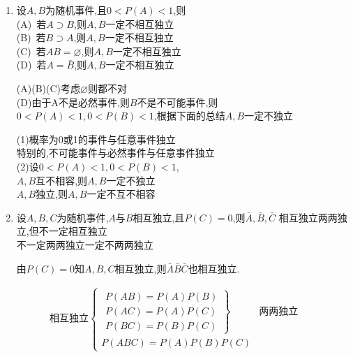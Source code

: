 \documentclass[12pt, a4paper, oneside, UTF8]{ctexbook}
\begin{document}
\begin{enumerate}[label=\arabic*.,start=12]
    \item  设$A,B$为随机事件,且$0<P(A)<1$,则 \\
        (A)\ 若$A\supset B$,则$A,B$一定不相互独立 \\
        (B)\ 若$B\supset A$,则$A,B$一定不相互独立 \\
        (C)\ 若$AB=\varnothing$,则$A,B$一定不相互独立 \\
        (D)\ 若$A=\bar{B}$,则$A,B$一定不相互独立
    
    \begin{solution}
    (A)(B)(C)考虑$\varnothing$则都不对\\
    (D)由于A不是必然事件,则$B$不是不可能事件,则$0<P(A)<1,0<P(B)<1$,根据下面的总结$A,B$一定不独立
    \end{solution}
    \begin{tcolorbox}[title=总结]
        (1)概率为0或1的事件与任意事件独立 \\
        特别的,不可能事件与必然事件与任意事件独立 \\
        (2)设$0<P(A)<1, 0<P(B)<1$, \\
        $A,B$互不相容,则$A,B$一定不独立 \\
        $A,B$独立,则$A,B$一定不互不相容
    \end{tcolorbox}
    \item  设$A,B,C$为随机事件,$A$与$B$相互独立,且$P(C)=0$,则$\bar{A},\bar{B},\bar{C}$
    \newline
    相互独立\qquad\qquad {}两两独立,但不一定相互独立 \\
    不一定两两独立\qquad {}一定不两两独立
    \begin{solution}
    由$P(C)=0$知$A,B,C$相互独立,则$\bar{A}\bar{B}\bar{C}$也相互独立.
    \end{solution}

\end{enumerate}
\begin{tcolorbox}[title=两两独立与相互独立]
    \begin{align*}
        \text{相互独立}\left\{\begin{matrix}
        \left.\begin{matrix}
        P(AB)=P(A)P(B) \\
        P(AC)=P(A)P(C) \\
        P(BC)=P(B)P(C)
        \end{matrix}\right\}& \text{两两独立} \\
        P(ABC)=P(A)P(B)P(C)
        \end{matrix}\right.
    \end{align*}
\end{tcolorbox}

\ifx\allfiles\undefined
\end{document}
